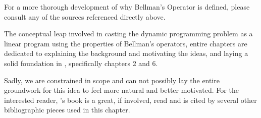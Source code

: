 For a more thorough development of why Bellman's Operator is defined, please
consult any of the sources referenced directly above.

The conceptual leap involved in casting the dynamic programming problem as a
linear program using the properties of Bellman's operators, entire chapters are
dedicated to explaining the background and motivating the ideas, and laying a
solid foundation in \cite{puterman2014}, specifically chapters 2 and 6.

Sadly, we are constrained in scope and can not possibly lay the entire
groundwork for this idea to feel more natural and better motivated. For the
interested reader, \citeauthor{puterman2014}'s book is a great, if involved,
read and is cited by several other bibliographic pieces used in this chapter.